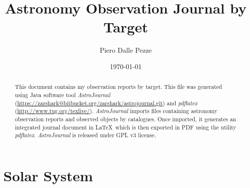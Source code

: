 \documentclass[10pt,twoside,a4paper,english]{article}
\title{Astronomy Observation Journal by Target}
\author{Piero Dalle Pezze}
\date{\today}
\begin{document}
 
 
\maketitle 
\thispagestyle{empty} 
 
\begin{abstract} 
This document contains my observation reports by target. This file was generated using Java software tool {\it AstroJournal} (\href{https://zarshark@bitbucket.org/zarshark/astrojournal.git}{https://zarshark@bitbucket.org/zarshark/astrojournal.git}) and {\it pdflatex} (\href{http://www.tug.org/texlive/}{http://www.tug.org/texlive/}). {\it AstroJournal} imports files containing astronomy observation reports and observed objects by catalogues. Once imported, it generates an integrated journal document in \LaTeX\ which is then exported in PDF using the utility {\it pdflatex}. {\it AstroJournal} is released under GPL v3 license. 
\end{abstract} 
 
\tableofcontents 
 
 
\clearpage 
 
 
\small 
 
\clearpage 
 
 
\normalsize 
\clearpage
\section{Solar System}

\vspace{4 mm}

\vspace{4 mm}

\vspace{4 mm}

\vspace{4 mm}

\vspace{4 mm}

\vspace{4 mm}

\vspace{4 mm}

\vspace{4 mm}

\vspace{4 mm}
\clearpage
\end{document}
